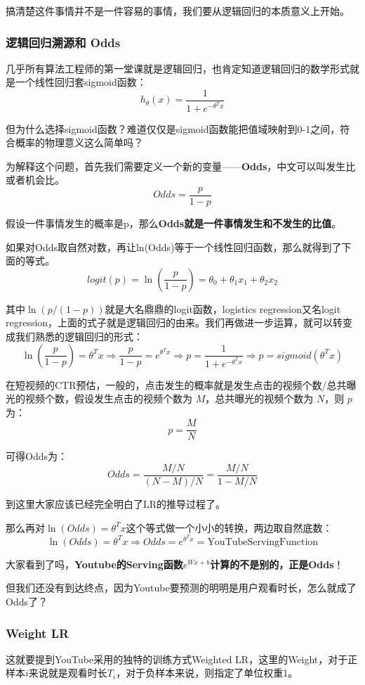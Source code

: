 \documentclass[12pt]{article}
\begin{document}
搞清楚这件事情并不是一件容易的事情，我们要从逻辑回归的本质意义上开始。

\subsubsection{逻辑回归溯源和 Odds}
几乎所有算法工程师的第一堂课就是逻辑回归，也肯定知道逻辑回归的数学形式就是一个线性回归套sigmoid函数：
$$
h_\theta(x) = \frac{1}{1+e^{-\theta^Tx}}
$$

但为什么选择sigmoid函数？难道仅仅是sigmoid函数能把值域映射到0-1之间，符合概率的物理意义这么简单吗？

为解释这个问题，首先我们需要定义一个新的变量——\textbf{Odds}，中文可以叫发生比或者机会比。
$$
Odds = \frac{p}{1-p}
$$

假设一件事情发生的概率是p，那么\textbf{Odds就是一件事情发生和不发生的比值}。

如果对Odds取自然对数，再让ln(Odds)等于一个线性回归函数，那么就得到了下面的等式。
$$
logit(p) = \ln(\frac{p}{1-p}) = \theta_0 + \theta_1x_1 + \theta_2x_2
$$

其中$\ln(p/(1-p))$就是大名鼎鼎的logit函数，logistics regression又名logit regression，上面的式子就是逻辑回归的由来。我们再做进一步运算，就可以转变成我们熟悉的逻辑回归的形式：
$$
 \ln(\frac{p}{1-p}) = \theta^Tx \Rightarrow \frac{p}{1-p} = e^{\theta^Tx} \Rightarrow p = \frac{1}{1+e^{-\theta^Tx}} \Rightarrow p = sigmoid(\theta^Tx)
$$

在短视频的CTR预估\cite{Understand_Weighted_LR}，一般的，点击发生的概率就是发生点击的视频个数/总共曝光的视频个数，假设发生点击的视频个数为 $M$，总共曝光的视频个数为 $N$，则 $p$ 为：
$$
p = \frac{M}{N}
$$

可得Odds为：
$$
Odds = \frac{M/N}{(N-M)/N} = \frac{M/N}{1-M/N} 
$$

到这里大家应该已经完全明白了LR的推导过程了。

那么再对$\ln(Odds) = \theta^Tx$这个等式做一个小小的转换，两边取自然底数：
$$
\ln(Odds) = \theta^Tx \Rightarrow Odds = e^{\theta^Tx} = \text{YouTubeServingFunction}
$$

大家看到了吗，\textbf{Youtube的Serving函数$e^{Wx+b}$计算的不是别的，正是Odds}！

但我们还没有到达终点，因为Youtube要预测的明明是用户观看时长，怎么就成了Odds了？

\subsubsection{Weight LR}
这就要提到YouTube采用的独特的训练方式Weighted LR，这里的Weight，对于正样本$i$来说就是观看时长$T_i$，对于负样本来说，则指定了单位权重1。
\end{document}
